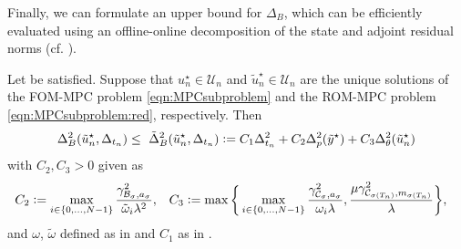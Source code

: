 \documentclass[reqno]{amsart}
\newcommand{\U}{{\mathscr U}}
\newcommand{\state}{\theta}
\newcommand{\adState}{p}
\newcommand{\inpVar}{u}
\newcommand{\outVar}{y}
\newcommand{\bOper}{\calB}
\newcommand{\cOper}{\calC}
\newcommand{\initBound}{\initBoundn{n}}%
\newcommand{\initBoundn}[1]{\Delta_{t_{#1}}}
\newcommand{\optInpVar}[1]{\inpVar_{#1}^\star}
\newcommand{\optInpVarN}{\optInpVar{n}}
\newcommand{\switch}{\sigma}
\newcommand{\reduce}[1]{\tilde{#1}}
\newcommand{\BoundControlB}{\Delta_{B}}
\newcommand{\BoundControlBtil}{\tilde\Delta_{B}}
\newcommand{\outVarRed}{\reduce{\outVar}}
\newcommand{\optInpVarRed}[1]{\reduce{\inpVar}_{#1}^\star}
\newcommand{\optInpVarRedN}{\optInpVarRed{n}}
\newcommand{\optOutVarRed}{\outVarRed^\star}
\newcommand{\calB}{\mathcal{B}}
\newcommand{\calC}{\mathcal{C}}
\newcommand{\abbr}[1]{\textsf{#1}\xspace}
\newcommand{\FOM}{\abbr{FOM}}
\newcommand{\ROM}{\abbr{ROM}}
\newcommand{\MPC}{\abbr{MPC}}
\begin{document}
%
Finally, we can formulate an upper bound for $\BoundControlB$, which can be efficiently evaluated using an offline-online decomposition of the state and adjoint residual norms (cf. \cite{patera2007reduced}).
%
\begin{corollary}
    \label{cor:errBoundOptimalControl} 
	Let  be satisfied. Suppose that $\optInpVarN \in \U_n$ and $\optInpVarRedN \in \U_n$ are the unique solutions of the \FOM-\MPC problem \eqref{eqn:MPCsubproblem} and the \ROM-\MPC problem \eqref{eqn:MPCsubproblem:red}, respectively. Then
    \begin{align}
    	\label{eq: a post estimate RB realization}
     \begin{aligned}
    \BoundControlB^2(\optInpVarRedN,\initBound) \leq\ \BoundControlBtil^2(\optInpVarRedN,\initBound)\vcentcolon=C_1\initBound^2+ C_2 \Delta^2_{\adState}(\optOutVarRed) 
          +C_3 \Delta^2_{\state}(\optInpVarRedN)
          \end{aligned}
    \end{align}
    with $C_2,C_3 >0$ given as
    \begin{align*}
     C_2 &\vcentcolon= \max_{i\in\{0,\ldots,N-1\}}\frac{\gamma^2_{\bOper_{\switch},{a}_{\switch}}}{\tilde \omega_i\lambda^2} , & 
     C_3 &\vcentcolon= \max\bigg\{\max_{i\in\{0,\ldots,N-1\}}\frac{\gamma^2_{\cOper_{\switch},{a}_{\switch}}}{ \omega_i\lambda }, \frac{\mu \gamma^2_{\cOper_{\sigma(T_n)},m_{\switch(T_n)}}}{\lambda}\bigg\}, 
    \end{align*}
    and $\omega$, $\tilde\omega$ defined as in   and $C_1$ as in .
\end{corollary}
\end{document}
